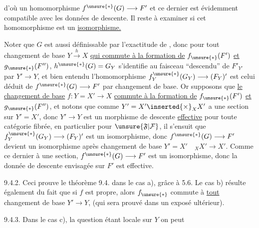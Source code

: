 
d'où un homomorphisme $f^{\unsure{*}}(G)\longrightarrow F'$ et ce dernier est évidemment compatible avec les données de descente. Il reste à examiner si cet homomorphisme est un \uline{isomorphisme.}


Noter que $G$ est aussi définissable par l'exactitude de
,
donc pour tout changement de base $Y\xrightarrow{h}X$ \uline{qui commute à la formation de} $f_{\unsure{*}}(F')$ \uline{et} $g_{\unsure{*}}(F'')$, $h^{\unsure{*}}(G)=G_Y$ s'identifie au faisceau ``descendu'' de $F'_{Y'}$ par $Y'\longrightarrow Y$, et bien entendu l'homomorphisme $f_Y^{\unsure{*}}(G_Y)\longrightarrow(F_Y)'$ est celui déduit de $f^{\unsure{*}}(G)\longrightarrow F'$ par changement de base. Or supposons que \uline{le changement de base} $f:Y=X'\longrightarrow X$ \uline{commute à la formation de} $f_{\unsure{*}}(F')$ \uline{et} $g_{\unsure{*}}(F'')$, et notons que comme $Y'=X'\inserted{\times}_X X'$ a une section sur $Y'=X'$, donc $Y'\longrightarrow Y$ est un morphisme de descente \uline{effective} pour toute catégorie fibrée, en particulier pour $\unsure{\mathfrak F|\mathcal F}$, il s'ensuit que $f_Y^{\unsure{*}}(G_Y)\longrightarrow(F_Y)'$ est un isomorphisme, donc $f^{\unsure{*}}(G)\longrightarrow F'$ devient un isomorphisme après changement de base $Y'=X'\quad{}_X X'\longrightarrow X'$. Comme ce dernier à une section, $f^{\unsure{*}}(G)\longrightarrow F'$ est un isomorphisme, donc la donnée de descente envisagée sur $F'$ est effective.

9.4.2. Ceci prouve le théorème 9.4. dans le cas a), grâce à 5.6. Le cas b) résulte également du fait que si $f$ est propre, alors $f_{\unsure{*}}$ commute à \uline{tout} changement de base $Y'\longrightarrow Y$, (qui sera prouvé dans un exposé ultérieur).

9.4.3. Dans le cas c), la question étant locale sur $Y$ on peut
